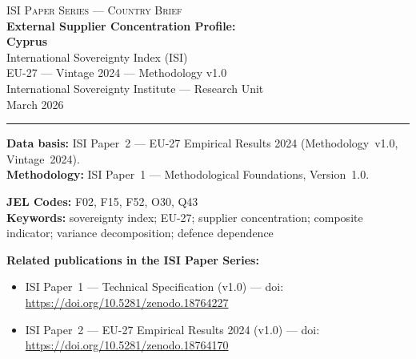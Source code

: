 \documentclass[12pt,a4paper]{article}
\begin{document}
\hypersetup{pageanchor=false}

\begin{titlepage}
\centering
\vspace*{2cm}
{\Large\textsc{ISI Paper Series --- Country Brief}}\\[1.2cm]
{\LARGE\bfseries External Supplier Concentration Profile:\\[0.3em]
Cyprus}\\[1.5cm]
{\large International Sovereignty Index (ISI)\\[0.3em]
EU-27 --- Vintage 2024 --- Methodology v1.0}\\[1.2cm]
{\large International Sovereignty Institute --- Research Unit}\\[0.8cm]
{\large March 2026}

\vspace{0.8cm}
\noindent\rule{\textwidth}{0.4pt}
\vspace{0.4cm}

\begin{flushleft}
\noindent\textbf{Data basis:} ISI Paper~2 --- EU-27 Empirical Results 2024 (Methodology~v1.0, Vintage~2024).\\[4pt]
\noindent\textbf{Methodology:} ISI Paper~1 --- Methodological Foundations, Version~1.0.

\medskip

\noindent\textbf{JEL Codes:} F02, F15, F52, O30, Q43\\[4pt]
\noindent\textbf{Keywords:} sovereignty index; EU-27; supplier concentration; composite indicator; variance decomposition; defence dependence

\medskip

\noindent\textbf{Related publications in the ISI Paper Series:}
\begin{itemize}[nosep,leftmargin=1.5em]
\item ISI Paper~1 --- Technical Specification (v1.0) --- doi:\\
  \url{https://doi.org/10.5281/zenodo.18764227}
\item ISI Paper~2 --- EU-27 Empirical Results 2024 (v1.0) --- doi:\\
  \url{https://doi.org/10.5281/zenodo.18764170}
\end{itemize}
\end{flushleft}
\vfill
\end{titlepage}
\end{document}
